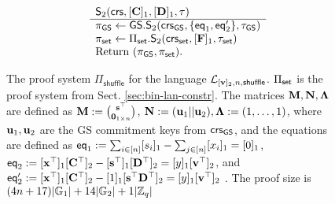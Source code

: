\begin{figure}
\begin{\algSize}
$$\begin{array}{ll}
\begin{array}{l}
\end{array}
&
\begin{array}{l}
{\mathsf{S}_2(\mathsf{crs},[\mathbf{{C}}]_1,[\mathbf{{D}}]_1,\tau)}\\
\hline
\pi_{\mathsf{GS}}\gets {\mathsf{GS}}.\mathsf{S}_2(\mathsf{crs}_{\mathsf{GS}},\{\mathsf{eq}_1,\mathsf{eq}'_2\},\tau_{\mathsf{GS}})\\
\pi_{\mathsf{set}}\gets \Pi_{\mathsf{set}}.\mathsf{S}_2(\mathsf{crs}_{\mathsf{set}},[\mathbf{{F}}]_1,\tau_{\mathsf{set}})\\
\text{Return }  (\pi_{\mathsf{GS}},\pi_{\mathsf{set}}).
\end{array}
\end{array}
$$
\end{\algSize}
\caption{The proof system $\Pi_\mathsf{shuffle}$ for the language $\mathcal{L}_{[\mathbf{v}]_2,n,\mathsf{shuffle}}$. $\Pi_{\mathsf{set}}$ is the proof system from Sect. \ref{sec:bin-lan-constr}. The matrices $\mathbf{{M}},\mathbf{{N}},\mathbf{{\Lambda}}$ are defined as
$\mathbf{{M}}:=\binom{\mathbf{s}^\top}{\mathbf{{0}}_{1\times n}}$,
$\mathbf{{N}}:=(\mathbf{u}_1||\mathbf{u}_2),\mathbf{{\Lambda}}:= (1,\ldots,1)$, where $\mathbf{u}_1,\mathbf{u}_2$ are the GS commitment keys from $\mathsf{crs}_{\mathsf{GS}}$, and the equations are defined as $\mathsf{eq}_1:= \sum_{i\in[n]}[s_i]_1-\sum_{j\in[n]}[{x}_i]_1 = [0]_1$, $\mathsf{eq}_2:= [\mathbf{x}^\top]_1[\mathbf{{C}}^\top]_2-[\mathbf{s}^\top]_1[\mathbf{{D}}^\top]_2=[y]_1[\mathbf{v}^\top]_2$, and $\mathsf{eq}'_2:= [\mathbf{x}^\top]_1[\mathbf{{C}}^\top]_2-[1]_1[\mathbf{s}^\top\mathbf{{D}}^\top]_2=[y]_1[\mathbf{v}^\top]_2$   
. The proof size is $(4n+17)|\mathbb{G}_1|+14|\mathbb{G}_2|+1|\mathbb{Z}_q|$
\label{fig:shuffles}}
\end{figure}
